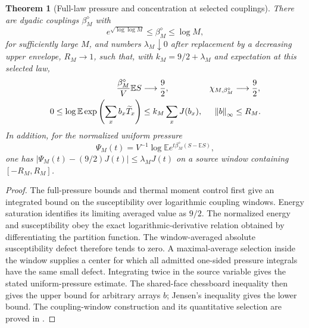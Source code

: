 \documentclass[11pt,oneside,openany]{book}
\newtheorem{theorem}{Theorem}[chapter]
\theoremstyle{definition}
\theoremstyle{remark}
\newcommand{\E}{\mathbb E}
\newcommand{\norm}[1]{\left\lVert#1\right\rVert}
\newcommand{\src}[2]{\cite[#2]{#1}}
\begin{document}
\begin{theorem}[Full-law pressure and concentration at selected couplings]
\label{thm:full-Wilson-source-window}
There are dyadic couplings $\beta_M^\diamond$ with
\[
 e^{\sqrt{\log\log M}}\le\beta_M^\diamond\le\log M,
\]
for sufficiently large $M$, and numbers $\lambda_M\downarrow0$ after
replacement by a decreasing upper envelope, $R_M\to1$, such that,
with $k_M=9/2+\lambda_M$ and expectation at this selected law,
\begin{align}
 \frac{\beta_M^\diamond}{V}\E S&\longrightarrow\frac92,&
 \chi_{M,\beta_M^\diamond}&\longrightarrow\frac92,\notag\\
 0\le \log\E\exp\left(\sum_xb_x\widetilde T_x\right)
       &\le k_M\sum_xJ(b_x),& \norm{b}_\infty&\le R_M.
 \label{eq:full-Wilson-source-window}
\end{align}
In addition, for the normalized uniform pressure
\[
 \Psi_M(t)=V^{-1}\log\E e^{t\beta_M^\diamond(S-\E S)},
\]
one has $|\Psi_M(t)-(9/2)J(t)|\le\lambda_MJ(t)$ on a source
window containing $[-R_M,R_M]$.
\end{theorem}
\begin{proof}
The full-pressure bounds and thermal moment control first give an
integrated bound on the susceptibility over logarithmic coupling
windows. Energy saturation identifies its limiting averaged value
as $9/2$. The normalized energy and susceptibility obey the exact
logarithmic-derivative relation obtained by differentiating the
partition function. The window-averaged absolute susceptibility
defect therefore tends to zero. A maximal-average selection inside
the window supplies a center for which all admitted one-sided
pressure integrals have the same small defect. Integrating twice in
the source variable gives the stated uniform-pressure estimate.
The shared-face chessboard inequality then gives the upper bound
for arbitrary arrays $b$; Jensen's inequality gives the lower bound.
The coupling-window construction and its quantitative selection are
proved in \src{F14}{V99--V100}.
\end{proof}
\end{document}
